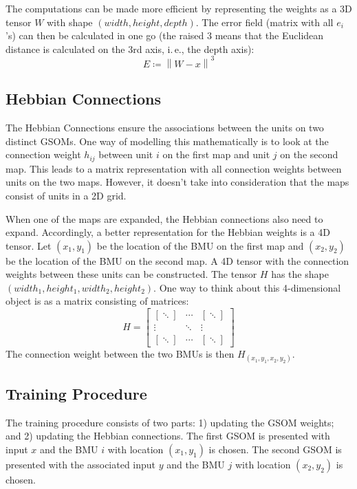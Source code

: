 \documentclass[twocolumn]{article}
\newcommand{\norm}[1]{\left\lVert #1 \right\rVert}
\begin{document}
The computations can be made more efficient by representing the weights as a 3D tensor $W$ with shape $(width, height, depth)$. The error field (matrix with all $e_i$'s) can then be calculated in one go (the raised 3 means that the Euclidean distance is calculated on the 3rd axis, i.\,e., the depth axis): \[
E \coloneq \norm{W - x}^3
\]

\subsection{Hebbian Connections} \label{sub:hebbian}
The Hebbian Connections ensure the associations between the units on two distinct GSOMs. One way of modelling this mathematically is to look at the connection weight $h_{ij}$ between unit $i$ on the first map and unit $j$ on the second map. This leads to a matrix representation with all connection weights between units on the two maps. However, it doesn't take into consideration that the maps consist of units in a 2D grid.

When one of the maps are expanded, the Hebbian connections also need to expand. Accordingly, a better representation for the Hebbian weights is a 4D tensor. Let $(x_1, y_1)$ be the location of the BMU on the first map and $(x_2, y_2)$ be the location of the BMU on the second map. A 4D tensor with the connection weights between these units can be constructed. The tensor $H$ has the shape $(width_1, height_1, width_2, height_2)$. One way to think about this 4-dimensional object is as a matrix consisting of matrices: \[
H =
\begin{bmatrix}
    \left[ \ddots \right] & \cdots & \left[ \ddots \right] \\
    \vdots & \ddots & \vdots \\
    \left[ \ddots \right] & \cdots & \left[ \ddots \right]
\end{bmatrix}
\]
The connection weight between the two BMUs is then $H_{(x_1, y_1, x_2, y_2)}$.

\subsection{Training Procedure} \label{sub:training}
The training procedure consists of two parts: 1) updating the GSOM weights; and 2) updating the Hebbian connections. The first GSOM is presented with input $x$ and the BMU $i$ with location $(x_1, y_1)$ is chosen. The second GSOM is presented with the associated input $y$ and the BMU $j$ with location $(x_2, y_2)$ is chosen.
\end{document}

